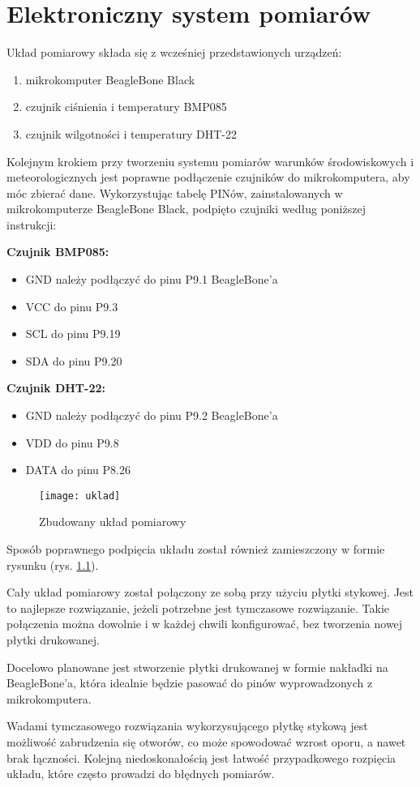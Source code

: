 \chapter{Elektroniczny system pomiarów}
Układ pomiarowy składa się z wcześniej przedstawionych urządzeń:

\begin{enumerate}
\setlength{\itemsep}{2pt} 
\setlength{\parskip}{2pt} 
\setlength{\parsep}{2pt}
\item mikrokomputer BeagleBone Black
\item czujnik ciśnienia i temperatury BMP085
\item czujnik wilgotności i temperatury DHT-22
\end{enumerate}

Kolejnym krokiem przy tworzeniu systemu pomiarów warunków środowiskowych i meteorologicznych jest poprawne podłączenie czujników do mikrokomputera, aby móc zbierać dane. Wykorzystując tabelę PINów, zainstalowanych w mikrokomputerze BeagleBone Black, podpięto czujniki według poniższej instrukcji:

\textbf{Czujnik BMP085:}
\begin{itemize}
\setlength{\itemsep}{2pt} 
\setlength{\parskip}{2pt} 
\setlength{\parsep}{2pt}
\item GND należy podłączyć do pinu P9.1 BeagleBone'a
\item VCC do pinu P9.3
\item SCL do pinu P9.19
\item SDA do pinu P9.20
\end{itemize}

\textbf{Czujnik DHT-22:}
\begin{itemize}
\setlength{\itemsep}{2pt} 
\setlength{\parskip}{2pt} 
\setlength{\parsep}{2pt}
\item GND należy podłączyć do pinu P9.2 BeagleBone'a
\item VDD do pinu P9.8
\item DATA do pinu P8.26
\end{itemize}

\begin{figure}[h!]
\centering
\texttt{[image: uklad]}
\caption{Zbudowany układ pomiarowy}
\label{fig:uklad}
\end{figure}

Sposób poprawnego podpięcia układu został również zamieszczony w formie rysunku (rys. \ref{fig:uklad}).

Cały układ pomiarowy został połączony ze sobą przy użyciu płytki stykowej. Jest to najlepsze rozwiązanie, jeżeli potrzebne jest tymczasowe rozwiązanie. Takie połączenia można dowolnie i w każdej chwili konfigurować, bez tworzenia nowej płytki drukowanej.

Docelowo planowane jest stworzenie płytki drukowanej w formie nakładki na BeagleBone'a, która idealnie będzie pasować do pinów wyprowadzonych z mikrokomputera.

Wadami tymczasowego rozwiązania wykorzysującego płytkę stykową jest możliwość zabrudzenia się otworów, co może spowodować wzrost oporu, a nawet brak łączności. Kolejną niedoskonałością jest łatwość przypadkowego rozpięcia układu, które często prowadzi do błędnych pomiarów.